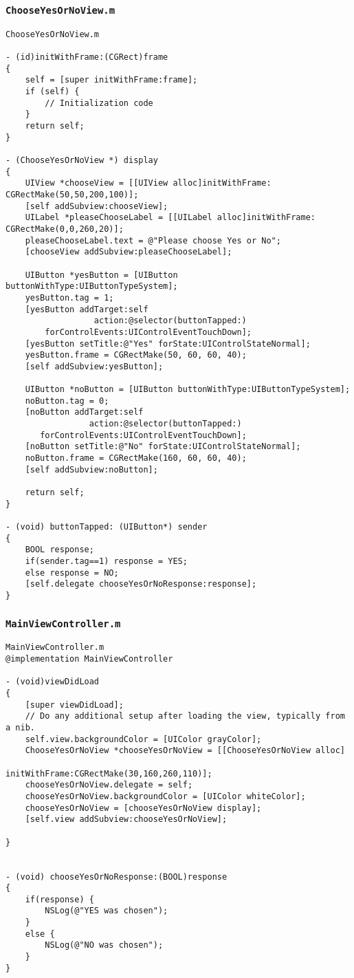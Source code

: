 \documentclass[12pt]{article}
\newcommand{\co}{\texttt}
\begin{document}
\subsubsection{\co{ChooseYesOrNoView.m}}
\begin{lstlisting}
ChooseYesOrNoView.m

- (id)initWithFrame:(CGRect)frame
{
    self = [super initWithFrame:frame];
    if (self) {
        // Initialization code
    }
    return self;
}

- (ChooseYesOrNoView *) display
{
    UIView *chooseView = [[UIView alloc]initWithFrame: CGRectMake(50,50,200,100)];
    [self addSubview:chooseView];
    UILabel *pleaseChooseLabel = [[UILabel alloc]initWithFrame: CGRectMake(0,0,260,20)];
    pleaseChooseLabel.text = @"Please choose Yes or No";
    [chooseView addSubview:pleaseChooseLabel];
    
    UIButton *yesButton = [UIButton buttonWithType:UIButtonTypeSystem];
    yesButton.tag = 1;
    [yesButton addTarget:self
                  action:@selector(buttonTapped:)
        forControlEvents:UIControlEventTouchDown];
    [yesButton setTitle:@"Yes" forState:UIControlStateNormal];
    yesButton.frame = CGRectMake(50, 60, 60, 40);
    [self addSubview:yesButton];
    
    UIButton *noButton = [UIButton buttonWithType:UIButtonTypeSystem];
    noButton.tag = 0;
    [noButton addTarget:self
                 action:@selector(buttonTapped:)
       forControlEvents:UIControlEventTouchDown];
    [noButton setTitle:@"No" forState:UIControlStateNormal];
    noButton.frame = CGRectMake(160, 60, 60, 40);
    [self addSubview:noButton];
    
    return self;
}

- (void) buttonTapped: (UIButton*) sender
{
    BOOL response;
    if(sender.tag==1) response = YES;
    else response = NO;
    [self.delegate chooseYesOrNoResponse:response];
}

\end{lstlisting}

\subsubsection{\co{MainViewController.m}}
\begin{lstlisting}
MainViewController.m
@implementation MainViewController

- (void)viewDidLoad
{
    [super viewDidLoad];
	// Do any additional setup after loading the view, typically from a nib.
    self.view.backgroundColor = [UIColor grayColor];
    ChooseYesOrNoView *chooseYesOrNoView = [[ChooseYesOrNoView alloc]
                             initWithFrame:CGRectMake(30,160,260,110)];
    chooseYesOrNoView.delegate = self;
    chooseYesOrNoView.backgroundColor = [UIColor whiteColor];
    chooseYesOrNoView = [chooseYesOrNoView display];
    [self.view addSubview:chooseYesOrNoView];
    
}


- (void) chooseYesOrNoResponse:(BOOL)response
{
    if(response) {
        NSLog(@"YES was chosen");
    }
    else {
        NSLog(@"NO was chosen");
    }
}

\end{lstlisting}
\end{document}
